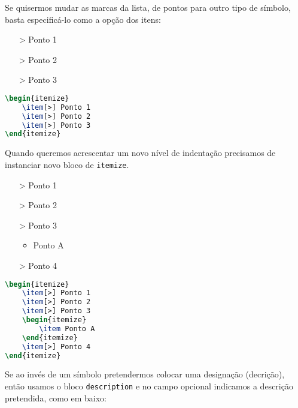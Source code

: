 \documentclass[a4paper, onecolumn, 10pt]{report}
\begin{document}
Se quisermos mudar as marcas da lista, de pontos para outro tipo de símbolo, basta especificá-lo como a opção dos itens:

\begin{itemize}
    \item[>] Ponto 1
    \item[>] Ponto 2
    \item[>] Ponto 3
\end{itemize}

\begin{lstlisting}[language=TeX]
\begin{itemize}
    \item[>] Ponto 1
    \item[>] Ponto 2
    \item[>] Ponto 3
\end{itemize}
\end{lstlisting}

Quando queremos acrescentar um novo nível de indentação precisamos de instanciar novo bloco de \texttt{itemize}.

\begin{itemize}
    \item[>] Ponto 1
    \item[>] Ponto 2
    \item[>] Ponto 3
    \begin{itemize}
        \item Ponto A
    \end{itemize}
    \item[>] Ponto 4
\end{itemize}

\begin{lstlisting}[language=TeX]
\begin{itemize}
    \item[>] Ponto 1
    \item[>] Ponto 2
    \item[>] Ponto 3
    \begin{itemize}
        \item Ponto A
    \end{itemize}
    \item[>] Ponto 4
\end{itemize}
\end{lstlisting}

Se ao invés de um símbolo pretendermos colocar uma designação (decrição), então usamos o bloco \texttt{description} e no campo opcional indicamos a descrição
pretendida, como em baixo:
\end{document}
